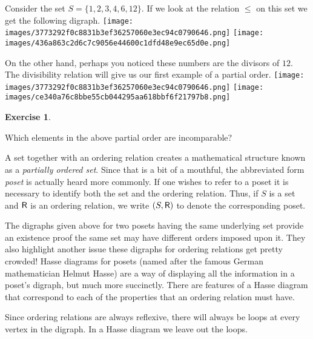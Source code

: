 \documentclass[10pt,]{book}
\theoremstyle{plain}
\theoremstyle{definition}
\theoremstyle{definition}
\newtheorem{exercise}[theorem]{Exercise}
\numberwithin{equation}{section}
\newcommand{\relR}{\mbox{\textsf R}}
\begin{document}
    Consider the set \(S = \{1, 2, 3, 4, 6, 12 \}\). If we look at the
    relation \(\leq\) on this set we get the following digraph.
\texttt{[image: images/3773292f0c8831b3ef36257060e3ec94c0790646.png]}
\texttt{[image: images/436a863c2d6c7c9056e44600c1dfd48e9ec65d0e.png]}
\par

    On the other hand, perhaps you noticed these numbers are the
    divisors of \(12\). The divisibility relation will give us our
    first example of a partial order.
\texttt{[image: images/3773292f0c8831b3ef36257060e3ec94c0790646.png]}
\texttt{[image: images/ce340a76c8bbe55cb044295aa618bbf6f21797b8.png]}
\begin{exercise}\label{exercise-53}

        Which elements in the above partial order are incomparable?
\end{exercise}
\par

    A set together with an ordering relation creates a mathematical
    structure known as a \emph{partially
    ordered set}. Since that is a bit of a mouthful, the abbreviated
    form \emph{poset} is actually heard more commonly.
    If one wishes to refer to a poset it is necessary to identify
    both the set and the ordering relation. Thus, if \(S\) is a set
    and \(\relR\) is an ordering relation, we write \((S, \relR)\) to
    denote the corresponding poset.
\par

    The digraphs given above for two posets having the same underlying
    set provide an existence proof \textemdash{} the same set may have different
    orders imposed upon it. They also highlight another issue \textemdash{} these
    digraphs for ordering relations get pretty crowded! 
    Hasse diagrams
    for posets (named after the famous German mathematician
    Helmut Hasse) are a way of displaying all the
    information in a poset's digraph, but much more succinctly. There
    are features of a Hasse diagram that correspond to each of the
    properties that an ordering relation must have.
\par

    Since ordering relations are always reflexive, there will always
    be loops at every vertex in the digraph. In a Hasse diagram we
    leave out the loops.
\par
\end{document}
